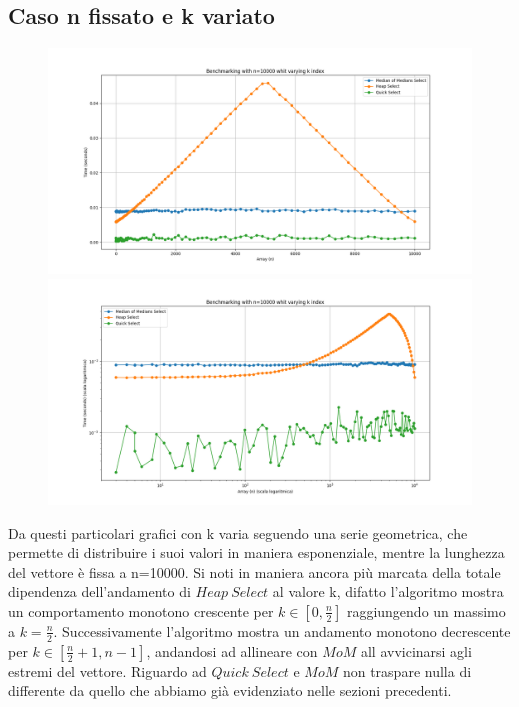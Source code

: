 \documentclass[a4paper]{article}
\begin{document}
\subsection{Caso n fissato e k variato}
\begin{figure}[h]
    \centering
    \includegraphics[width=.83\textwidth]{graphs/n_fixex_n.png}
    \includegraphics[width=.83\textwidth]{graphs/n_fixed_2xlog.png}
\end{figure}
Da questi particolari grafici con k varia seguendo una serie geometrica, che permette di distribuire i suoi valori in maniera esponenziale, mentre la lunghezza del vettore è fissa a n=10000. Si noti in maniera ancora più marcata della totale dipendenza dell'andamento di $Heap\ Select$ al valore k, difatto l'algoritmo mostra un comportamento monotono crescente per $k\in[0,\frac{n}{2}]$ raggiungendo un massimo a $k=\frac{n}{2}$. 
Successivamente l'algoritmo mostra un andamento monotono decrescente per $k\in[\frac{n}{2}+1,n-1]$, andandosi ad allineare con $MoM$ all avvicinarsi agli estremi del vettore. Riguardo ad $Quick\ Select$ e $MoM$ non traspare nulla di differente da quello che abbiamo già evidenziato nelle sezioni precedenti.\\
\newpage
\end{document}
